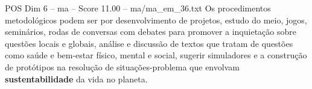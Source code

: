 \begin{textsample}{POS Dim 6 – ma – Score 11.00 – ma/ma\_em\_36.txt}
Os procedimentos metodológicos podem ser por desenvolvimento de projetos, estudo do meio, jogos, seminários, rodas de conversas com debates para promover a inquietação sobre questões locais e globais, análise e discussão de textos que tratam de questões como saúde e bem-estar físico, mental e social, sugerir simuladores e a construção de protótipos na resolução de situações-problema que envolvam \textbf{sustentabilidade} da vida no planeta.

\end{textsample}
